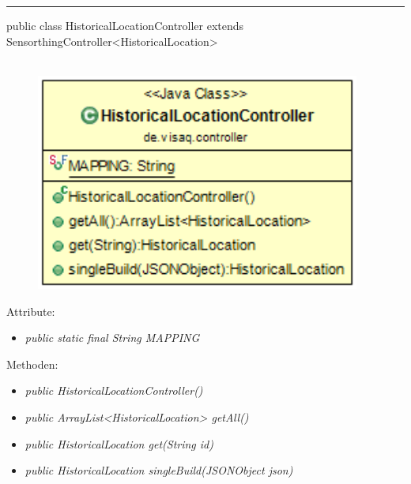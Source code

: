 \rule{\textwidth}{0.4pt}
public class HistoricalLocationController extends SensorthingController<HistoricalLocation>
\\\\
\begin{minipage}{0.4\textwidth}
    \begin{figure}[H]
        {\centering\includegraphics[width=0.95\textwidth]{media/backend/controller/classes/HistoricalLocationController.png}}
    \end{figure}
    \end{minipage} \hfill
\begin{minipage}{0.6\textwidth}
\end{minipage}

Attribute:
\begin{itemize}
    \item \emph{public static final String MAPPING} \mappingDescription
\end{itemize}
Methoden:
\begin{itemize}
    \item \emph{public HistoricalLocationController()}
    \item \emph{public ArrayList<HistoricalLocation> getAll()}
    \extendsSensorthingController
    \item \emph{public HistoricalLocation get(String id)}
    \extendsSensorthingController
    \item \emph{public HistoricalLocation singleBuild(JSONObject json)}
    \extendsSensorthingController
\end{itemize}

